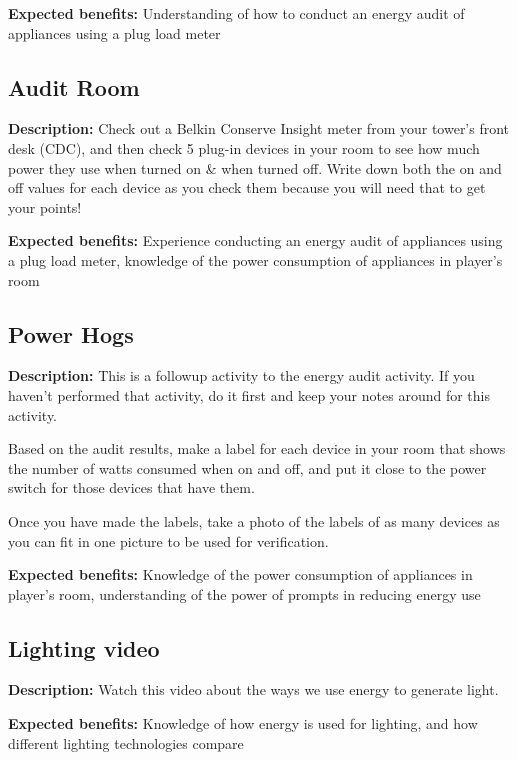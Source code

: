 \vspace{2ex}
\textbf{Expected benefits:} Understanding of how to conduct an energy audit of appliances using a plug load meter


\subsection{Audit Room}

\textbf{Description:} Check out a Belkin Conserve Insight meter from your tower's front desk (CDC), and then check 5 plug-in devices in your room to see how much power they use when turned on \& when turned off. Write down both the on and off values for each device as you check them because you will need that to get your points!

\vspace{2ex}
\textbf{Expected benefits:} Experience conducting an energy audit of appliances using a plug load meter, knowledge of the power consumption of appliances in player's room


\subsection{Power Hogs}

\textbf{Description:} This is a followup activity to the energy audit activity. If you haven't performed that activity, do it first and keep your notes around for this activity.

Based on the audit results, make a label for each device in your room that shows the number of watts consumed when on and off, and put it close to the power switch for those devices that have them.

Once you have made the labels, take a photo of the labels of as many devices as you can fit in one picture to be used for verification.

\vspace{2ex}
\textbf{Expected benefits:} Knowledge of the power consumption of appliances in player's room, understanding of the power of prompts in reducing energy use


\subsection{Lighting video}

\textbf{Description:} Watch this video about the ways we use energy to generate light.

\vspace{2ex}
\textbf{Expected benefits:} Knowledge of how energy is used for lighting, and how different lighting technologies compare


